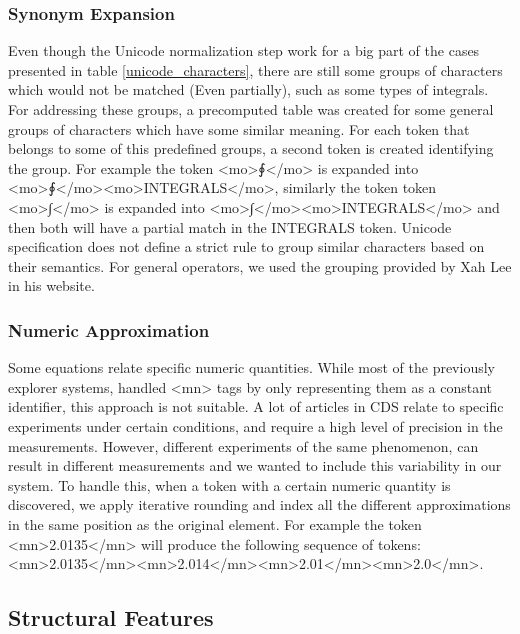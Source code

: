 \subsubsection{Synonym Expansion}
Even though the Unicode normalization step work for a big part of the cases presented in table \ref{unicode_characters}, there are still some groups of characters which would not be matched (Even partially), such as some types of integrals. For addressing these groups, a precomputed table was created for some general groups of characters which have some similar meaning. For each token that belongs to some of this predefined groups, a second token is created identifying the group.
For example the token <mo>{\unicodefont ∮}</mo> is expanded into <mo>{\unicodefont ∮}</mo><mo>INTEGRALS</mo>, similarly the token token <mo>{\unicodefont ∫}</mo> is expanded into <mo>{\unicodefont ∫}</mo><mo>INTEGRALS</mo> and then both will have a partial match in the INTEGRALS token. 
Unicode specification does not define a strict rule to group similar characters based on their semantics. For general operators, we used the grouping provided by Xah Lee in his website\cite{math_groups}.

\subsubsection{Numeric Approximation} 
Some equations relate specific numeric quantities. While most of the previously explorer systems, handled <mn> tags by only representing them as a constant identifier, this approach is not suitable. A lot of articles in CDS relate to specific experiments under certain conditions, and require a high level of precision in the measurements. However, different experiments of the same phenomenon, can result in different measurements and we wanted to include this variability in our system. To handle this, when a token with a certain numeric quantity is discovered, we apply iterative rounding and index all the different approximations in the same position as the original element. For example the token <mn>2.0135</mn> will produce the following sequence of tokens: <mn>2.0135</mn><mn>2.014</mn><mn>2.01</mn><mn>2.0</mn>. 


\subsection{Structural Features}


